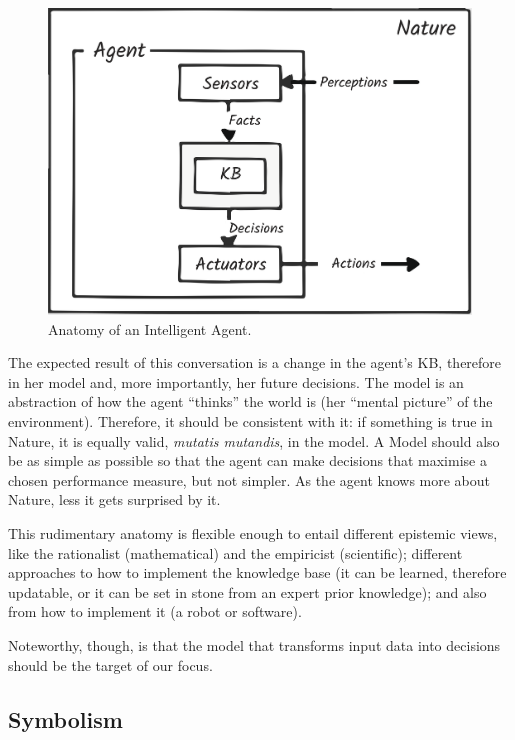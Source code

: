 \documentclass[
  letterpaper,
  12pt,
  british]{tufte-book}
\theoremstyle{plain}
\theoremstyle{definition}
\theoremstyle{plain}
\theoremstyle{remark}
\begin{document}
\begin{figure}

{\centering \includegraphics{Images/anatomy.png}

}

\caption{Anatomy of an Intelligent Agent.}

\end{figure}

The expected result of this conversation is a change in the agent's
{KB}, therefore in her model and, more importantly, her future
decisions. The model is an abstraction of how the agent ``thinks'' the
world is (her ``mental picture'' of the environment). Therefore, it
should be consistent with it: if something is true in Nature, it is
equally valid, \emph{mutatis mutandis}, in the model. A Model should
also be as simple as possible so that the agent can make decisions that
maximise a chosen performance measure, but not simpler. As the agent
knows more about Nature, less it gets surprised by it.

This rudimentary anatomy is flexible enough to entail different
epistemic views, like the rationalist (mathematical) and the empiricist
(scientific); different approaches to how to implement the knowledge
base (it can be learned, therefore updatable, or it can be set in stone
from an expert prior knowledge); and also from how to implement it (a
robot or software).

Noteworthy, though, is that the model that transforms input data into
decisions should be the target of our focus.

\hypertarget{symbolism}{%
\subsection{Symbolism}\label{symbolism}}
\end{document}

